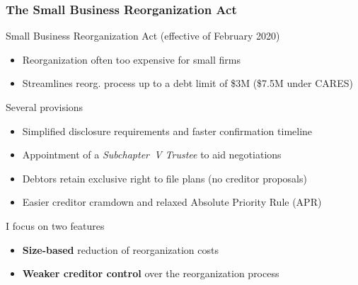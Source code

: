 \documentclass[aspectratio=169,xcolor=table]{beamer}
\begin{document}
\begin{frame}[label = SBRA]  \frametitle{The Small Business Reorganization Act \hfill \hyperlink{EUandUS}{}}

Small Business Reorganization Act (effective of February 2020)
\begin{itemize} \small
    \item Reorganization often too expensive for small firms 
    \item Streamlines reorg. process up to a debt limit of \$3M  (\$7.5M under CARES) 
\end{itemize} \normalsize 

Several provisions 
\begin{itemize} \small
    \item Simplified disclosure requirements and faster confirmation timeline
    \item Appointment of a \textit{Subchapter~V Trustee} to aid negotiations
    \item Debtors retain exclusive right to file plans (no creditor proposals)
    \item Easier creditor cramdown and relaxed Absolute Priority Rule (APR)
\end{itemize} \normalsize 

I focus on two features
\begin{itemize} \small
    \item \textbf{Size-based} reduction of reorganization costs
    \item \textbf{Weaker creditor control} over the reorganization process
\end{itemize} \normalsize

\end{frame}
\end{document}
